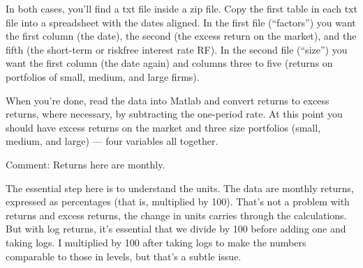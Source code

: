 \documentclass[11pt]{exam}
\begin{document}
\begin{questions}
In both cases, you'll find a txt file inside a zip file.
Copy the first table in each txt file into a spreadsheet with the dates aligned.
In the first file (``factors'') you want the first column (the date),
the second (the excess return on the market),
and the fifth (the short-term or riskfree interest rate RF).
In the second file (``size'') you want the first column (the date again)
and columns three to five (returns on portfolios of small, medium, and large firms).

When you're done, read the data into Matlab and convert returns
to excess returns, where necessary, by subtracting the one-period rate.
At this point you should have excess returns
on the market and three size portfolios (small, medium, and large) ---
four variables all together.
%
%
Comment:
Returns here are monthly.

\begin{solution}
The essential step here is to understand the units.
The data are monthly returns, expressed as percentages
(that is, multiplied by 100).
That's not a problem with returns and excess returns,
the change in units carries through the calculations.
But with log returns, it's essential that we divide by 100
before adding one and taking logs.
I multiplied by 100 after taking logs to make the numbers comparable
to those in levels, but that's a subtle issue.


\end{solution}
\end{questions}
\end{document}
